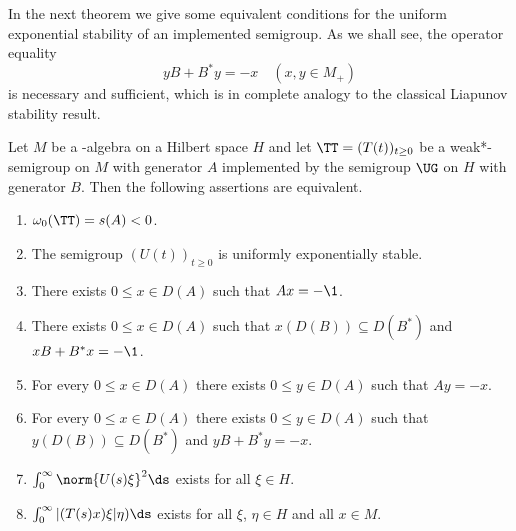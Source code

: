 In the next theorem we give some equivalent conditions for the uniform exponential stability of an implemented semigroup.
As we shall see, the operator equality
\[
yB + B^{*}y = -x \quad (x, y \in M_{+})
\]
is necessary and sufficient, which is in complete analogy to the classical Liapunov stability result.
\begin{theorem}\label{thm:d4-2.2}
Let $M$ be a \WA-algebra on a Hilbert space $H$ and let $\TT = (T(t))_{t \geq 0}$ be a weak*-semigroup on $M$ with generator $A$ implemented by the semigroup $\UG$ on $H$ with generator $B$.
Then the following assertions are equivalent.
\begin{enumerate}[\upshape (a)]

\item\label{item:d4-2.2-a}
$\omega_{0}(\TT) = s(A) < 0$.

\item\label{item:d4-2.2-b}
The semigroup $(U(t))_{t \geq 0}$ is uniformly exponentially stable.

\item\label{item:d4-2.2-c}
There exists $0 \leq x \in D(A)$ such that $Ax = -\1$.

\item\label{item:d4-2.2-d}
There exists $0 \leq x \in D(A)$ such that $x(D(B)) \subseteq D(B^{*})$ \mbox{and $xB+B^{*}x = -\1$}.

\item\label{item:d4-2.2-e}
For every $0 \leq x \in D(A)$ there exists $0 \leq y \in D(A)$ such that $Ay = -x$.

\item\label{item:d4-2.2-f}
For every $0 \leq x \in D(A)$ there exists $0 \leq y \in D(A)$ such that $y(D(B)) \subseteq D(B^{*})$ and $yB+B^{*}y = -x$.

\item\label{item:d4-2.2-g}
$\int_{0}^{\infty} \norm{U(s)\xi}^2 \ds$ exists for all $\xi \in H$.

\item\label{item:d4-2.2-h}
$\int_{0}^{\infty} |(T(s)x)\xi|\eta) \ds$ exists for all $\xi$, $\eta \in H$ and all $x \in M$.
\end{enumerate}
\end{theorem}

